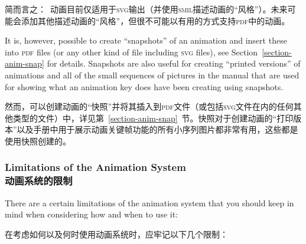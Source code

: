 简而言之：\tikzname\ 动画目前仅适用于\textsc{svg}输出（并使用\textsc{smil}描述动画的“风格”）。未来可能会添加其他描述动画的“风格”，但很不可能以有用的方式支持\textsc{pdf}中的动画。

It is, however, possible to create ``snapshots'' of an animation and insert
these into \textsc{pdf} files (or any other kind of file including \textsc{svg}
files), see Section~\ref{section-anim-snap} for details. Snapshots are also
useful for creating ``printed versions'' of animations and all of the small
sequences of pictures in the manual that are used for showing what an animation
key does have been creating using snapshots.

然而，可以创建动画的“快照”并将其插入到\textsc{pdf}文件（或包括\textsc{svg}文件在内的任何其他类型的文件）中，详见第~\ref{section-anim-snap}~节。快照对于创建动画的“打印版本”以及手册中用于展示动画关键帧功能的所有小序列图片都非常有用，这些都是使用快照创建的。


\subsubsection{Limitations of the Animation System\\动画系统的限制}

There are a certain limitations of the animation system that you should keep in
mind when considering how and when to use it:

在考虑如何以及何时使用动画系统时，应牢记以下几个限制：


